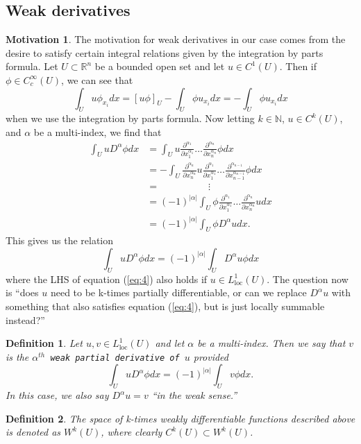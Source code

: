 \documentclass[11pt]{article}
\newtheorem{definition}{Definition}
\theoremstyle{definition}
\newtheorem*{motivation}{Motivation}
\begin{document}
\subsection{Weak derivatives}
\begin{motivation}
	The motivation for weak derivatives in our case comes from the desire to satisfy certain integral relations given by the integration by parts formula.
	Let $U \subset \mathbb{R}^n$ be a bounded open set and let $u\in C^1(U)$. Then if $\phi \in C_{c}^{\infty}(U)$, we can see that
	\begin{equation*}
		\int_U u\phi_{x_i}dx = [u\phi]_U - \int_U \phi u_{x_i}dx = - \int_U \phi u_{x_i}dx
	\end{equation*}
	when we use the integration by parts formula. Now letting $k\in \mathbb{N}$, $u \in C^k(U)$, and $\alpha$ be a multi-index, we find that
	\begin{equation*}
		\begin{aligned}
			\int_U u D^{\alpha}\phi dx &= \int_U u \frac{\partial^{\alpha_1}}{\partial x_1^{\alpha_1}}\dots\frac{\partial^{\alpha_n}}{\partial x_n^{\alpha_n}}\phi dx \\
						   &= - \int_U \frac{\partial^{\alpha_n}}{\partial x_n^{\alpha_n}}u \frac{\partial^{\alpha_1}}{\partial x_1^{\alpha_1}}\dots\frac{\partial^{\alpha_{n-1}}}{\partial x_{n-1}^{\alpha_{n-1}}}\phi dx \\
						   &= \quad\qquad\qquad\vdots \\ 
						   &= (-1)^{|\alpha|}\int_U \phi\frac{\partial^{\alpha_1}}{\partial x_1^{\alpha_1}}\dots\frac{\partial^{\alpha_n}}{\partial x_n^{\alpha_n}}u dx \\
						   &= (-1)^{|\alpha|}\int_U \phi D^{\alpha}u dx.
		\end{aligned}
	\end{equation*}
	This gives us the relation
	\begin{equation}
		\label{eq:4}
		\int_U u D^{\alpha}\phi dx = (-1)^{|\alpha|}\int_U D^{\alpha}u\phi  dx
	\end{equation}
	where the LHS of equation (\ref{eq:4}) also holds if $u\in L_{\text{loc}}^1(U)$.
	The question now is ``does $u$ need to be k-times partially differentiable, or can we replace $D^{\alpha}u$ with something that also satisfies
	equation (\ref{eq:4}), but is just locally summable instead?''
\end{motivation}
\begin{definition}
	Let $u,v \in L_{\text{loc}}^1(U)$ and let $\alpha$ be a multi-index. Then we say that $v$ is the 
	\texttt{$\alpha^{th}$ weak partial derivative of $u$} provided
	\begin{equation*}
		\int_U u D^{\alpha}\phi dx = (-1)^{|\alpha|}\int_U v \phi dx.
	\end{equation*}
	In this case, we also say $D^{\alpha}u = v$ ``in the weak sense.''
\end{definition}
\begin{definition}
	The space of k-times weakly differentiable functions described above is denoted as $W^k(U)$, where clearly $C^k(U) \subset W^k(U)$.
\end{definition}
\end{document}
